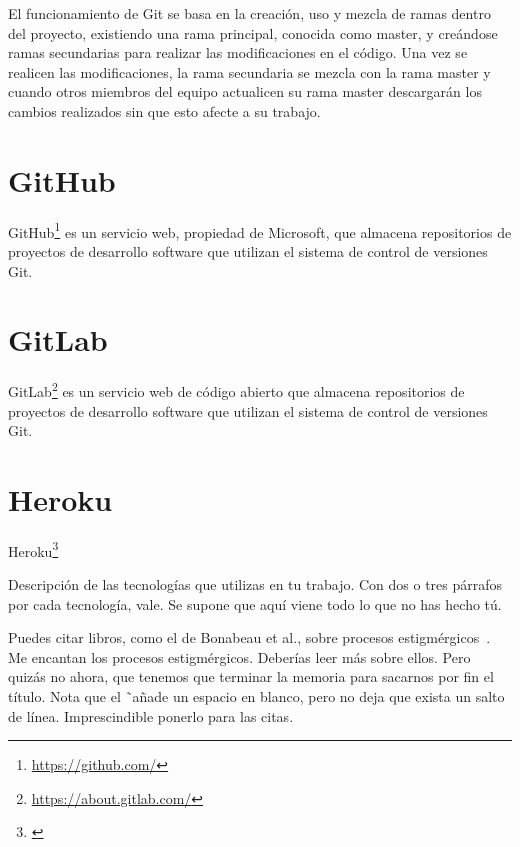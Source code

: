 \documentclass[a4paper, 12pt]{book}
\begin{document}
El funcionamiento de Git se basa en la creación, uso y mezcla de ramas dentro del proyecto, existiendo una rama principal, conocida como master, y creándose ramas secundarias para realizar las modificaciones en el código. Una vez se realicen las modificaciones, la rama secundaria se mezcla con la rama master y cuando otros miembros del equipo actualicen su rama master descargarán los cambios realizados sin que esto afecte a su trabajo.


\section{GitHub} 
\label{sec:github}

GitHub\footnote{\url{https://github.com/}} es un servicio web, propiedad de Microsoft, que almacena repositorios de proyectos de desarrollo software que utilizan el sistema de control de versiones Git.

\section{GitLab} 
\label{sec:gitlab}

GitLab\footnote{\url{https://about.gitlab.com/}} es un servicio web de código abierto que almacena repositorios de proyectos de desarrollo software que utilizan el sistema de control de versiones Git.

\section{Heroku} 
\label{sec:Heroku}

Heroku\footnote{\url{}}

Descripción de las tecnologías que utilizas en tu trabajo. 
Con dos o tres párrafos por cada tecnología, vale. 
Se supone que aquí viene todo lo que no has hecho tú.

Puedes citar libros, como el de Bonabeau et al., sobre procesos estigmérgicos~\cite{bonabeau:_swarm}. 
Me encantan los procesos estigmérgicos.
Deberías leer más sobre ellos.
Pero quizás no ahora, que tenemos que terminar la memoria para sacarnos por fin el título.
Nota que el \~ \ añade un espacio en blanco, pero no deja que exista un salto de línea. 
Imprescindible ponerlo para las citas.
\end{document}

